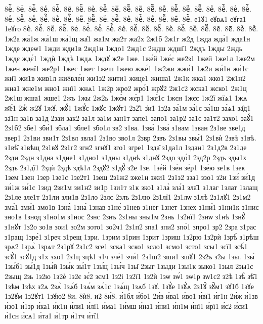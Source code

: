 {8еⷭ҇.
8еⷮ.
8еⷮ҇.
8еⷯ.
8еⷯ҇.
8еⷰ.
8еⷰ҇.
8еⷱ.
8еⷱ҇.
8еⷲ.
8еⷲ҇.
8еⷳ.
8еⷳ҇.
8еⷴ.
8еⷴ҇.
8еⷵ.
8еⷵ҇.
8еⷶ.
8еⷶ҇.
8еⷷ.
8еⷷ҇.
8еⷸ.
8еⷸ҇.
8еⷹ.
8еⷹ҇.
8еⷺ.
8еⷺ҇.
8еⷻ.
8еⷻ҇.
8еⷼ.
8еⷼ҇.
8еⷽ.
8еⷽ҇.
8еⷾ.
8еⷾ҇.
8еⷿ.
8еⷿ҇.
е1ꙋ1
еꙋвѧ1
еꙋга1
1еꙋго
8еꙴ.
8еꙴ҇.
8еꙵ.
8еꙵ҇.
8еꙶ.
8еꙶ҇.
8еꙷ.
8еꙷ҇.
8еꙸ.
8еꙸ҇.
8еꙹ.
8еꙹ҇.
8еꙺ.
8еꙺ҇.
8еꙻ.
8еꙻ҇.
8е꙼.
8е꙼҇.
8е꙽.
8е꙽҇.
1ж2а
жа́1ж
жа́1ш
жа́1щ
жа̑1
жа1м
жа2т
жа2х
2ж1б
2ж1г
ж2д
1жда
жда́1
жда1н
1жде
ждеѡ1
1жди
жди1в
2жд1н
1ждо1
2жд1с
2ждш
ждшї1
2ждъ
1жды
2ждь
1ждє
ждє́1
1ждѝ
1ждѣ
1ждѧ
1ждꙋ
ж2е
1же.
1же́й
1же́с
же2з1
1жей
1же1л
1же2м
1жен
женї1
же2р1
1жес
1жет
1жеш
1жею
жже́1
1ж2жи
жжи́1
1ж2и
жи́1н
жи́1с
жи̑1
жи1в
жив1л
жи8вле́н
жи1з2
жити1
жице1
жиша1
2ж1к
жка1
жко1
2ж1н2
жна1
жне1м
жно1
жнї1
жнѧ1
1ж2р
жро2
жро́1
жрꙋ2
2ж1с2
жска1
жско1
2ж1ц
2ж1ш
жша1
жше1
2жъ
1жы
2ж2ь
1жє́м
жє́р1
1жє́1с
1жєн
1жєс
1ж2ї
жїѧ1
1жѧ
ж҃е́1
2жⷭ
ж2ꙋ
1жꙋ.
жꙋ́1
1жꙋ́с
1жꙋс
1жꙋт1
2з2̾1
з̾и1
1з2а
за́1м
за́1с
за́1ш
за́ѧ1
за̑д1
за̑1н
за1в
за1д
2заи
зак2
за1л
за1м
зан1т
запе1
запо1
за1р2
за1с
за1т2
захо1
заꙋ́1
2з1б2
збе1
зби́1
збла1
збле1
збо1л
зв2
з1ва.
1зва̀
1зва́
з1вам
1зван
2з1ве
зве1д
звер1
2з1ви
зви1т
2з1вл
звла1
2з1во
зво1л
2звр
2звъ
2з1вы
звы́1
2з1вѝ
2звѣ
з1вѣ.
з1вѣ̑
з1вѣщ
2з1вꙋ
2з1г2
згн2
згнꙋ1
зго1
згре1
1зда̑
з1да1л
1здан1
2з1д2в
2з1де
2зди
2здн
з1дна
з1дне1
з1дно1
з1дны
з1днѣ
з1днꙋ
2здо
здо́1
2зд2р
2здъ
зды1х
2здь
2з1дї1
2здѝ
2здѣ
здѣ1л
2здꙋ2
з1дꙋ́
з2е
1зе.
1зе́й
1зе́н
зе́р1
1зе́ю
зе1в
1зек
1зем
1зен
1зер
1зе1с
1зе2т1
1зеш
2з1ж2
зже1н
зжи1
2з1з2
зза1
ззо1
з2и
1зи́
зи́1д
зи́1ж
зи́1с
1зид
2зи1м
зи1н2
зи1р
1зи1т
з1к
зко1
з1ла̀
зла́1
зла̑1
з1лаг
1злат
1злащ
2з1ле
зле1т
2з1ли
зли1в
2з1ло
2злс
2злъ
2з1лю
2з1лї1
2з1лѡ
з1лѣ
2з1лꙋ1
2з1м2
зма́1
зми́1
змо1в
1зна̀
1зна́
1знав
з1не́
з1нев
з1нег
1знет
1знех
з1ни́1
з1ни1к
з1нис
зно1в
1знод
з1но1м
з1нос
2знс
2знъ
2з1ны
зны1м
2знь
1з2нї1
2знѡ
з1нѣ
1знꙋ́
з1нꙋт
1з2о
зо1в
зои1
зо2м
зото1
зо2ч1
2з1п2
зпа1
зпи2
зпо́1
зпро1
зр2
2зра
з1рас
з1ращ
1зре́1
з1реч
з1рещ
1зри.
1зрим
з1рин
1зрит
1зриш
1з2рю
1з2рѝ
1зрѣ̀
з1рѣш
зрѧ2
1зрѧ̀
1зрѧт
2з1рꙋ
2з1с2
зсе1
зска1
зско1
зсло1
зсмо1
зсто1
зсы1
зсї1
зсѣ́1
зсꙋ́1
зсꙋ1д
з1х
зхо1
2з1ц
зцѣ1
з1ч
зче́1
зчи́1
2з1ш2
зши1
зшꙋ1
2з2ъ
з2ы
1зы.
1зы̀
1зы́б1
зы́1д
1зы́й
1зы́к
зы́1т
1зы́ц
1зы́ч
1зы̑
2зыг
1зыди
1зы1к
зыко1
1зыл
2зы1с
2зыщ
2зь
1з2ю
1з2ѐ
1з2є
зє́2
зєм1
1з2і
1з2ї1
1з2ѝ
1зѡ
зѡ́1
зѡ1р
зѡ1с2
з2ѣ
1зѣ̀
зѣ̑1
1зѣм
1зѣх
з2ѧ
2зѧ̀
1зѧ́б
1зѧ́м
зѧ́1с
1зѧ́щ
1зѧб
1зꙋ.
1зꙋ́е
1зꙋ́ѧ
2з1ꙋ̑
зꙋ̑м1
зꙋ1б
1зꙋе
1з2ꙋм
1з2ꙋт1
1зꙋю2
8и.
8ѝ8.
и2́
8и́8.
и́1бл
и́бо1
2и́в
и́ва1
и́во1
и́вї1
и́г1н
2и́ж
и́1зв
и́зо1
и́1зр
и́ка1
и́к1н
и́ли1
и́лї1
и́ма1
1и́мш
и́на1
и́ни1
и́н1м
и́нї1
и́рї1
и́с2
и́си1
и́1сн
и́сѧ1
и́та1
и́1тр
и́1тч
и́тї1
}
